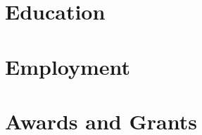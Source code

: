 \documentclass{prometheus_cv}
\begin{document}
\thispagestyle{empty}					%
\pagestyle{fancy}			 		%

\vspace*{-1cm}
\centering 





\vspace*{0cm}

\section{Education}



\section{Employment}


\section{Awards and Grants}


% 
\end{document}
